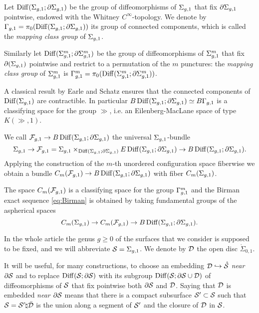 \begin{defn}
 \label{def:mcg}
 Let $\Diff(\sg;\partial\sg)$ be the group of diffeomorphisms of $\sg$ that fix $\partial\sg$ pointwise,
 endowed with the Whitney $C^{\infty}$-topology. We denote by $\gg=\pi_0(\Diff(\sg;\partial\sg))$ its group of connected
 components, which is called the \emph{mapping class group} of $\sg$.
 
 Similarly let $\Diff(\sgm;\partial\sgm)$ be the group of diffeomorphisms of $\sgm$ that fix $\partial(\sg)$
 pointwise and restrict to a permutation of the $m$ punctures: the \emph{mapping class group} of $\sgm$ is
 $\ggm=\pi_0(\Diff(\sgm;\partial\sgm))$.
 \end{defn}
 A classical result by Earle and Schatz \cite{EarleSchatz} ensures that the connected components
 of $\Diff(\sg)$ are contractible. In particular $B\Diff(\sg;\partial\sg)\simeq B\gg$ is
 a classifying space for
 the group $\gg$, i.e. an Eilenberg-MacLane space of type $K(\gg,1)$.
 
 We call $\cF_{g,1}\to B\Diff(\sg;\partial\sg)$ the universal
 $\sg$-bundle
 \[
  \sg\to\cF_{g,1}=\sg\times_{\Diff(\sg;\partial\sg)}E\Diff(\sg;\partial\sg)\to B\Diff(\sg;\partial\sg).
 \]
Applying the construction of the $m$-th unordered configuration space fiberwise we obtain a bundle
$C_m(\cF_{g,1})\to B\Diff(\sg;\partial\sg)$ with fiber $C_m(\sg)$.

The space $C_m(\cF_{g,1})$ is a classifying space for the
group $\ggm$ and the Birman exact sequence \eqref{eq:Birman} is obtained by taking fundamental
groups of the aspherical spaces
\begin{equation}\label{eq:Birmanbundle}
C_m(\sg)\to C_m(\cF_{g,1})\to B\Diff(\sg;\partial\sg).
\end{equation}

In the whole article the genus $g\geq 0$ of the surfaces that we consider is supposed to be fixed,
and we will abbreviate $\S=\sg$.
We denote by $\D$ the open disc $\mathring{\Sigma}_{0,1}$.

It will be useful, for many constructions, to choose an embedding
$\D\hookrightarrow\mrS$ \emph{near} $\partial\S$ and to replace
$\Diff(\S;\partial\S)$ with its subgroup $\Diff(\S;\partial\S\cup\D)$ of diffeomorphisms
of $\S$ that fix pointwise both $\partial\S$ and $\D$. Saying that $\D$ is embedded
\emph{near $\partial\S$} means that there is a compact subsurface $\S'\subset\S$
such that $\S=\S'\natural\bar\D$ is the union along a segment of $\S'$ and the closure of $\D$ in $\S$.

